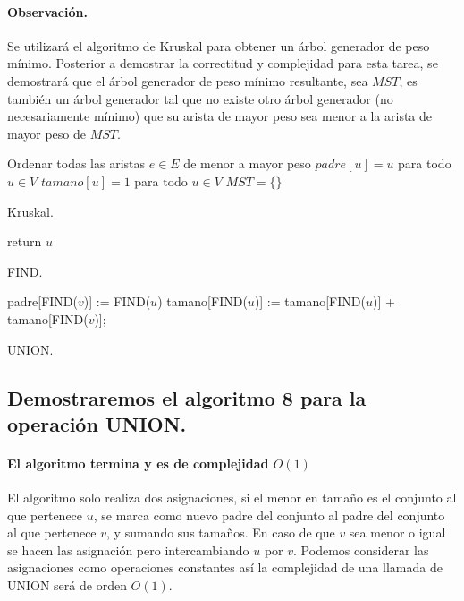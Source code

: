 \documentclass[12pt]{article}
\begin{document}
\paragraph{Observación.} Se utilizará el algoritmo de Kruskal para obtener un árbol generador de peso mínimo. Posterior a demostrar la correctitud y complejidad para esta tarea, se demostrará que el árbol generador de peso mínimo resultante, sea $MST$, es también un árbol generador tal que no existe otro árbol generador (no necesariamente mínimo) que su arista de mayor peso sea menor a la arista de mayor peso de $MST$.\\
\begin{algorithm}[H]\footnotesize
	\SetAlgoLined
	Ordenar todas las aristas $e \in E$ de menor a mayor peso\;
	$padre[u]=u$ para todo $u\in V$\;
	$tamano[u]=1$ para todo $u\in V$\;
	$MST = \{\}$\;
	\caption{Kruskal.}
\end{algorithm}
\begin{algorithm}[H]\footnotesize
	\SetAlgoLined
	return $u$\;
	\caption{FIND.}
\end{algorithm}
\begin{algorithm}[H]\footnotesize
	\SetAlgoLined
	 {
	padre[FIND($v$)] := FIND($u$)\;
	tamano[FIND($u$)] := tamano[FIND($u$)] + tamano[FIND($v$)];
	}
	\caption{UNION.}
\end{algorithm}
\subsection{Demostraremos el algoritmo 8 para la operación UNION.}
\paragraph{El algoritmo termina y es de complejidad $O(1)$} El algoritmo solo realiza dos asignaciones, si el menor en tamaño es el conjunto al que pertenece $u$, se marca como nuevo padre del conjunto al padre del conjunto al que pertenece $v$, y sumando sus tamaños. En caso de que $v$ sea menor o igual se hacen las asignación pero intercambiando $u$ por $v$. Podemos considerar las asignaciones como operaciones constantes así la complejidad de una llamada de UNION será de orden $O(1)$.
\end{document}
